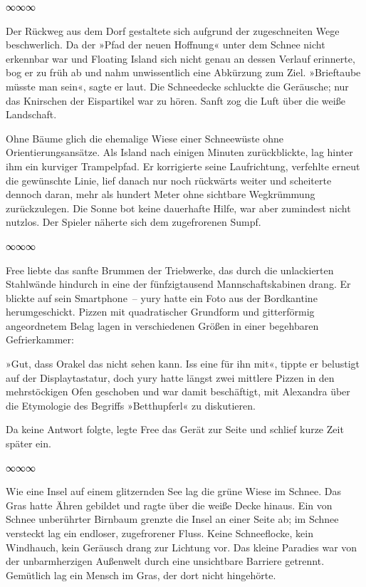 \begin{center}
∞∞∞
\end{center}

Der Rückweg aus dem Dorf gestaltete sich aufgrund der zugeschneiten Wege beschwerlich. Da der »Pfad der neuen Hoffnung« unter dem Schnee nicht erkennbar war und Floating Island sich nicht genau an dessen Verlauf erinnerte, bog er zu früh ab und nahm unwissentlich eine Abkürzung zum Ziel. »Brieftaube müsste man sein«, sagte er laut. Die Schneedecke schluckte die Geräusche; nur das Knirschen der Eispartikel war zu hören. Sanft zog die Luft über die weiße Landschaft.

Ohne Bäume glich die ehemalige Wiese einer Schneewüste ohne Orientierungsansätze. Als Island nach einigen Minuten zurückblickte, lag hinter ihm ein kurviger Trampelpfad. Er korrigierte seine Laufrichtung, verfehlte erneut die gewünschte Linie, lief danach nur noch rückwärts weiter und scheiterte dennoch daran, mehr als hundert Meter ohne sichtbare Wegkrümmung zurückzulegen. Die Sonne bot keine dauerhafte Hilfe, war aber zumindest nicht nutzlos. Der Spieler näherte sich dem zugefrorenen Sumpf.

\begin{center}
∞∞∞
\end{center}

Free liebte das sanfte Brummen der Triebwerke, das durch die unlackierten Stahlwände hindurch in eine der fünfzigtausend Mannschaftskabinen drang. Er blickte auf sein Smartphone~– yury hatte ein Foto aus der Bordkantine herumgeschickt. Pizzen mit quadratischer Grundform und gitterförmig angeordnetem Belag lagen in verschiedenen Größen in einer begehbaren Gefrierkammer: 

»Gut, dass Orakel das nicht sehen kann. Iss eine für ihn mit«, tippte er belustigt auf der Displaytastatur, doch yury hatte längst zwei mittlere Pizzen in den mehrstöckigen Ofen geschoben und war damit beschäftigt, mit Alexandra über die Etymologie des Begriffs »Betthupferl« zu diskutieren.

Da keine Antwort folgte, legte Free das Gerät zur Seite und schlief kurze Zeit später ein.

\begin{center}
∞∞∞
\end{center}

Wie eine Insel auf einem glitzernden See lag die grüne Wiese im Schnee. Das Gras hatte Ähren gebildet und ragte über die weiße Decke hinaus.  Ein von Schnee unberührter Birnbaum grenzte die Insel an einer Seite ab; im Schnee versteckt lag ein endloser, zugefrorener Fluss. Keine Schneeflocke, kein Windhauch, kein Geräusch drang zur Lichtung vor. Das kleine Paradies war von der unbarmherzigen Außenwelt durch eine unsichtbare Barriere getrennt. Gemütlich lag ein Mensch im Gras, der dort nicht hingehörte.


